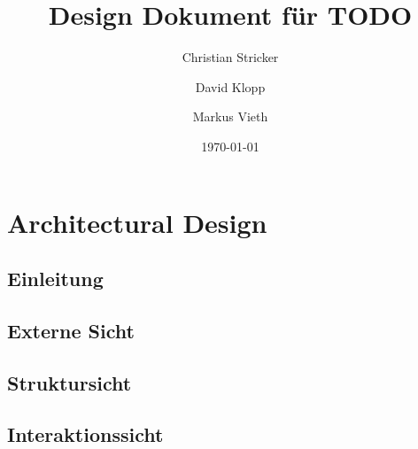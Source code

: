 \documentclass{book}
\title{Design Dokument für TODO}
\author{Christian Stricker \and David Klopp \and Markus Vieth}
\date{\today}
\begin{document}
\frontmatter
\maketitle
\tableofcontents
\mainmatter


\part{Architectural Design}

\chapter{Einleitung}

 
\chapter{Externe Sicht}


\chapter{Struktursicht}%
%
 
\chapter{Interaktionssicht}

 
\end{document}
